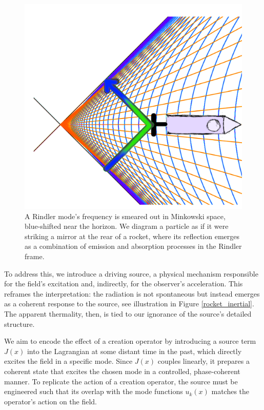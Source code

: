 \documentclass[12pt,a4paper]{article}
\begin{document}
\begin{figure}[h]
\centering
\includegraphics[scale=1.5]{emit_absorb.png}
\captionsetup{width=0.7\textwidth}
\caption{
  A Rindler mode's frequency is smeared out in Minkowski space, blue-shifted near the horizon. We diagram a particle as if it were striking a mirror at the rear of a rocket, where its reflection emerges as a combination of emission and absorption processes in the Rindler frame.}
\label{emit_absorb}
\end{figure}

To address this, we introduce a driving source, a physical mechanism responsible for the field's excitation and, indirectly, for the observer's acceleration. This reframes the interpretation: the radiation is not spontaneous but instead emerges as a coherent response to the source, see illustration in Figure \ref{rocket_inertial}. The apparent thermality, then, is tied to our ignorance of the source's detailed structure.

We aim to encode the effect of a creation operator by introducing a source term $J(x)$ into the Lagrangian at some distant time in the past, which directly excites the field in a specific mode. Since $J(x)$ couples linearly, it prepares a coherent state that excites the chosen mode in a controlled, phase-coherent manner. To replicate the action of a creation operator, the source must be engineered such that its overlap with the mode functions $u_k(x)$ matches the operator’s action on the field.
\end{document}
